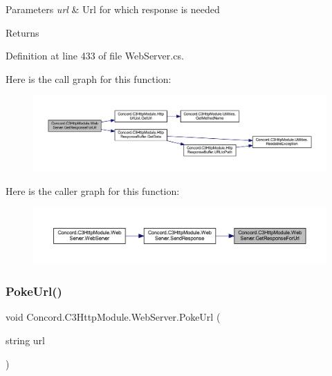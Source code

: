 \begin{DoxyParams}{Parameters}
{\em url} & Url for which response is needed\\
\hline
\end{DoxyParams}
\begin{DoxyReturn}{Returns}

\end{DoxyReturn}


Definition at line 433 of file Web\+Server.\+cs.

Here is the call graph for this function\+:
\nopagebreak
\begin{figure}[H]
\begin{center}
\leavevmode
\includegraphics[width=350pt]{class_concord_1_1_c3_http_module_1_1_web_server_a406b1bfca1b92cedbfb0bdb792ae275f_cgraph}
\end{center}
\end{figure}
Here is the caller graph for this function\+:
\nopagebreak
\begin{figure}[H]
\begin{center}
\leavevmode
\includegraphics[width=350pt]{class_concord_1_1_c3_http_module_1_1_web_server_a406b1bfca1b92cedbfb0bdb792ae275f_icgraph}
\end{center}
\end{figure}
\mbox{\label{class_concord_1_1_c3_http_module_1_1_web_server_ad58516396d74972ad8f1005c889e1379}} 
\subsubsection{\texorpdfstring{PokeUrl()}{PokeUrl()}}
{\footnotesize\ttfamily void Concord.\+C3\+Http\+Module.\+Web\+Server.\+Poke\+Url (\begin{DoxyParamCaption}\item[{string}]{url }\end{DoxyParamCaption})\hspace{0.3cm}{\ttfamily [inline]}}




